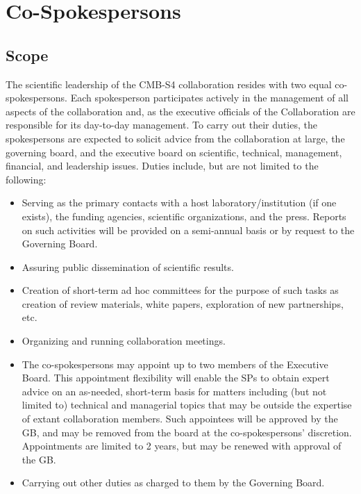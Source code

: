 \documentclass[12pt]{article}
\newcommand{\Comment}[1]{\textcolor{Blue}{(Comment: #1)}}
\begin{document}
\section{Co-Spokespersons}
\label{sec:spokes}

\subsection{Scope}

The	scientific leadership of the CMB-S4 collaboration resides with two equal co-spokespersons.			
Each spokesperson participates actively in the management of all aspects of the	collaboration and, as the executive officials of the Collaboration are responsible for its day-to-day management. 
To carry out their duties, the spokespersons are expected to solicit advice from the collaboration at large, the governing board, and the	
executive board on scientific, technical, management, financial, and leadership issues.  
Duties include, but are not limited to the following: 
\begin{itemize}
\item Serving as the primary contacts with a  host laboratory/institution (if one exists), the funding agencies, scientific organizations, and the press. Reports on such activities will be provided on a semi-annual basis or by request to the Governing Board.
\item Assuring public dissemination of scientific results. 
\item Creation of short-term ad hoc committees for the purpose of such tasks as creation of review materials, white papers, exploration of new partnerships, etc.
\item Organizing and running collaboration meetings. 
\item The co-spokespersons may appoint up to two members of the Executive Board. This appointment flexibility will enable the SPs to obtain expert advice on an as-needed, short-term basis for matters including (but not limited to) technical and managerial topics that may be outside the expertise of extant collaboration members. Such appointees will be approved by the GB, 
and may be removed from the board at the co-spokespersons' discretion. Appointments are limited to 2 years, but may be renewed with approval of the GB. 
\item Carrying out other duties as charged to them by the Governing Board.


\end{itemize}
\end{document}
